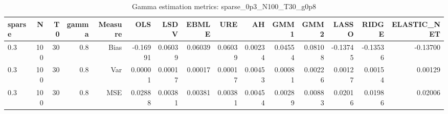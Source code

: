 \begin{table}[!htbp]\centering
\caption{Gamma estimation metrics: sparse_0p3_N100_T30_g0p8}
\label{tab:table1_sparse_0p3_N100_T30_g0p8}
\begin{tabular}{lrrrrrrrrrrrrrr}
\hline
sparse & N & T0 & gamma & Measure & OLS & LSDV & EBMLE & URE & AH & GMM1 & GMM2 & LASSO & RIDGE & ELASTIC_NET \\
\hline
0.3 & 100 & 30 & 0.8 & Bias & -0.16991 & 0.06039 & 0.06039 & 0.06039 & 0.00234 & 0.04554 & 0.08108 & -0.13745 & -0.13536 & -0.13700 \\
0.3 & 100 & 30 & 0.8 & Var & 0.00001 & 0.00017 & 0.00017 & 0.00017 & 0.00453 & 0.00081 & 0.00226 & 0.00127 & 0.00154 & 0.00129 \\
0.3 & 100 & 30 & 0.8 & MSE & 0.02888 & 0.00381 & 0.00381 & 0.00381 & 0.00454 & 0.00289 & 0.00883 & 0.02016 & 0.01986 & 0.02006 \\
\hline
\end{tabular}
\end{table}

